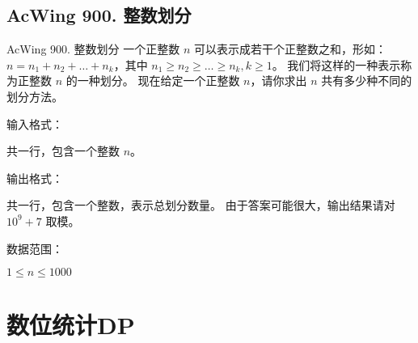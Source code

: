 \subsection{AcWing 900. 整数划分}
\begin{titledbox}{AcWing 900. 整数划分}
    一个正整数 $n$ 可以表示成若干个正整数之和，形如：$n = n_1 + n_2 + \dots + n_k$，其中 $n_1 \ge n_2 \ge \dots \ge n_k, k \ge 1$。 我们将这样的一种表示称为正整数 $n$ 的一种划分。 现在给定一个正整数 $n$，请你求出 $n$ 共有多少种不同的划分方法。

    输入格式：

    共一行，包含一个整数 $n$。

    输出格式：

    共一行，包含一个整数，表示总划分数量。 由于答案可能很大，输出结果请对 $10^9 + 7$ 取模。

    数据范围：

    $1 \le n \le 1000$

    \begin{inputblock}
    \end{inputblock}
    \begin{outputblock}
    \end{outputblock}
\end{titledbox}


\section{数位统计DP}

